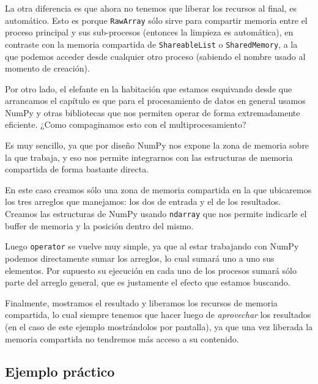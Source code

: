 La otra diferencia es que ahora no tenemos que liberar los recursos al final, es automático. Esto es porque \texttt{RawArray} sólo sirve para compartir memoria entre el proceso principal y sus sub-procesos (entonces la limpieza es automática), en contraste con la memoria compartida de \texttt{ShareableList} o \texttt{SharedMemory}, a la que podemos acceder desde cualquier otro proceso (sabiendo el nombre usado al momento de creación).


Por otro lado, el elefante en la habitación que estamos esquivando desde que arrancamos el capítulo es que para el procesamiento de datos en general usamos NumPy y otras bibliotecas que nos permiten operar de forma extremadamente eficiente. ¿Como compaginamos esto con el multiprocesamiento?

Es muy sencillo, ya que por diseño NumPy nos expone la zona de memoria sobre la que trabaja, y eso nos permite integrarnos con las estructuras de memoria compartida de forma bastante directa.


En este caso creamos sólo una zona de memoria compartida en la que ubicaremos los tres arreglos que manejamos: los dos de entrada y el de los resultados. Creamos las estructuras de NumPy usando \texttt{ndarray} que nos permite indicarle el buffer de memoria y la posición dentro del mismo.

Luego \texttt{operator} se vuelve muy simple, ya que al estar trabajando con NumPy podemos directamente sumar los arreglos, lo cual sumará uno a uno sus elementos. Por supuesto su ejecución en cada uno de los procesos sumará sólo parte del arreglo general, que es justamente el efecto que estamos buscando.

Finalmente, mostramos el resultado y liberamos los recursos de memoria compartida, lo cual siempre tenemos que hacer luego de \textit{aprovechar} los resultados (en el caso de este ejemplo mostrándolos por pantalla), ya que una vez liberada la memoria compartida no tendremos más acceso a su contenido.


\subsection{Ejemplo práctico}


